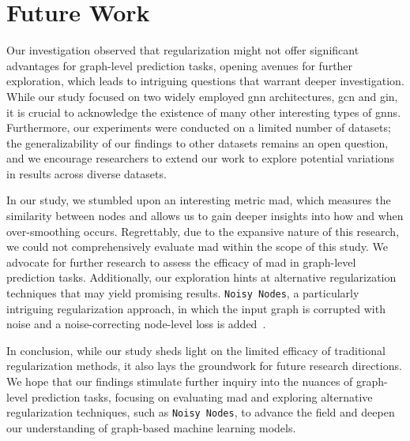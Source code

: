 \section{Future Work}
\label{sec:conclusion:future}

Our investigation observed that regularization might not offer significant advantages for graph-level prediction tasks, opening avenues for further exploration, which leads to intriguing questions that warrant deeper investigation.
While our study focused on two widely employed \ac{gnn} architectures, \ac{gcn} and \ac{gin}, it is crucial to acknowledge the existence of many other interesting types of \acp{gnn}.
Furthermore, our experiments were conducted on a limited number of datasets;
the generalizability of our findings to other datasets remains an open question, and we encourage researchers to extend our work to explore potential variations in results across diverse datasets.

In our study, we stumbled upon an interesting metric \ac{mad}, which measures the similarity between nodes and allows us to gain deeper insights into how and when over-smoothing occurs.
Regrettably, due to the expansive nature of this research, we could not comprehensively evaluate \ac{mad} within the scope of this study.
We advocate for further research to assess the efficacy of \ac{mad} in graph-level prediction tasks.
Additionally, our exploration hints at alternative regularization techniques that may yield promising results.
\texttt{Noisy Nodes}, a particularly intriguing regularization approach, in which the input graph is corrupted with noise and a noise-correcting node-level loss is added~\cite{God22}.

In conclusion, while our study sheds light on the limited efficacy of traditional regularization methods, it also lays the groundwork for future research directions.
We hope that our findings stimulate further inquiry into the nuances of graph-level prediction tasks, focusing on evaluating \ac{mad} and exploring alternative regularization techniques, such as \texttt{Noisy Nodes}, to advance the field and deepen our understanding of graph-based machine learning models.
